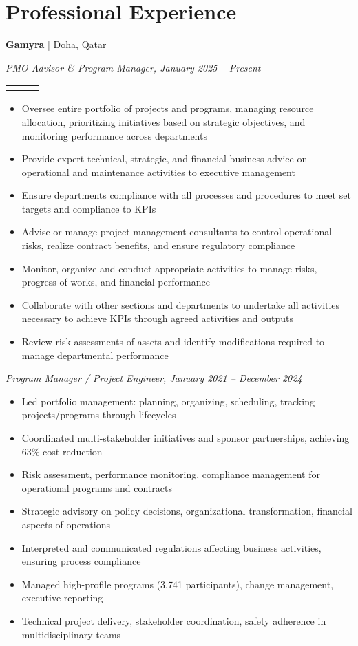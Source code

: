 \documentclass[a4paper,12pt]{article}
\makeatletter
\newenvironment{joblong}[2]
    {
    \begin{tabularx}{\linewidth}{@{}l X r@{}}
    \textbf{#1} & \hfill &  #2 \\[3.75pt]
    \end{tabularx}
    \begin{minipage}[t]{\linewidth}
    \begin{itemize}[nosep,after=\strut, leftmargin=1em, itemsep=3pt,label=--]
    }
    {
    \end{itemize}
    \end{minipage}
    }
\makeatother
\begin{document}
\section{Professional Experience}

\textbf{Gamyra} | Doha, Qatar

\small{\textit{PMO Advisor \& Program Manager, January 2025 -- Present}}

\begin{joblong}{\emph{}}{}
\item Oversee entire portfolio of projects and programs, managing resource allocation, prioritizing initiatives based on strategic objectives, and monitoring performance across departments
\item Provide expert technical, strategic, and financial business advice on operational and maintenance activities to executive management
\item Ensure departments compliance with all processes and procedures to meet set targets and compliance to KPIs
\item Advise or manage project management consultants to control operational risks, realize contract benefits, and ensure regulatory compliance
\item Monitor, organize and conduct appropriate activities to manage risks, progress of works, and financial performance
\item Collaborate with other sections and departments to undertake all activities necessary to achieve KPIs through agreed activities and outputs
\item Review risk assessments of assets and identify modifications required to manage departmental performance
\end{joblong}

\vspace{5pt}

\small{\textit{Program Manager / Project Engineer, January 2021 -- December 2024}}

\begin{itemize}[nosep,after=\strut, leftmargin=1em, itemsep=3pt,label=--]
\item Led portfolio management: planning, organizing, scheduling, tracking projects/programs through lifecycles
\item Coordinated multi-stakeholder initiatives and sponsor partnerships, achieving 63\% cost reduction
\item Risk assessment, performance monitoring, compliance management for operational programs and contracts
\item Strategic advisory on policy decisions, organizational transformation, financial aspects of operations
\item Interpreted and communicated regulations affecting business activities, ensuring process compliance
\item Managed high-profile programs (3,741 participants), change management, executive reporting
\item Technical project delivery, stakeholder coordination, safety adherence in multidisciplinary teams
\end{itemize}
\end{document}
